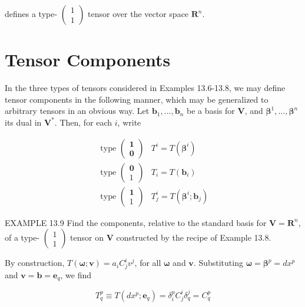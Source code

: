 \documentclass[10pt]{article}
\begin{document}
defines a type- $\left(\begin{array}{l}1 \\ 1\end{array}\right)$ tensor over the vector space $\mathbf{R}^{n}$.

\section*{Tensor Components}
In the three types of tensors considered in Examples 13.6-13.8, we may define tensor components in the following manner, which may be generalized to arbitrary tensors in an obvious way. Let $\mathbf{b}_{1}, \ldots, \mathbf{b}_{n}$ be a basis for $\mathbf{V}$, and $\boldsymbol{\beta}^{1}, \ldots, \boldsymbol{\beta}^{n}$ its dual in $\mathbf{V}^{*}$. Then, for each $i$, write

$$
\begin{array}{ll}
\text { type }\left(\begin{array}{l}
\mathbf{1} \\
\mathbf{0}
\end{array}\right) & T^{i}=T\left(\boldsymbol{\beta}^{i}\right) \\
\text { type }\left(\begin{array}{l}
\mathbf{0} \\
1
\end{array}\right) & T_{i}=T\left(\mathbf{b}_{i}\right) \\
\text { type }\left(\begin{array}{l}
\mathbf{1} \\
1
\end{array}\right) & T_{j}^{i}=T\left(\boldsymbol{\beta}^{i} ; \mathbf{b}_{j}\right)
\end{array}
$$

EXAMPLE 13.9 Find the components, relative to the standard basis for $\mathbf{V}=\mathbf{R}^{n}$, of a type- $\left(\begin{array}{l}1 \\ 1\end{array}\right)$ tensor on $\mathbf{V}$ constructed by the recipe of Example 13.8.

By construction, $T(\boldsymbol{\omega} ; \mathbf{v})=a_{i} C_{j}^{i} v^{j}$, for all $\boldsymbol{\omega}$ and $\mathbf{v}$. Substituting $\boldsymbol{\omega}=\boldsymbol{\beta}^{p}=d x^{p}$ and $\mathbf{v}=\mathbf{b}=\mathbf{e}_{q}$, we find

$$
T_{q}^{p} \equiv T\left(d x^{p} ; \mathbf{e}_{q}\right)=\delta_{i}^{p} C_{j}^{i} \delta_{q}^{j}=C_{q}^{p}
$$
\end{document}

